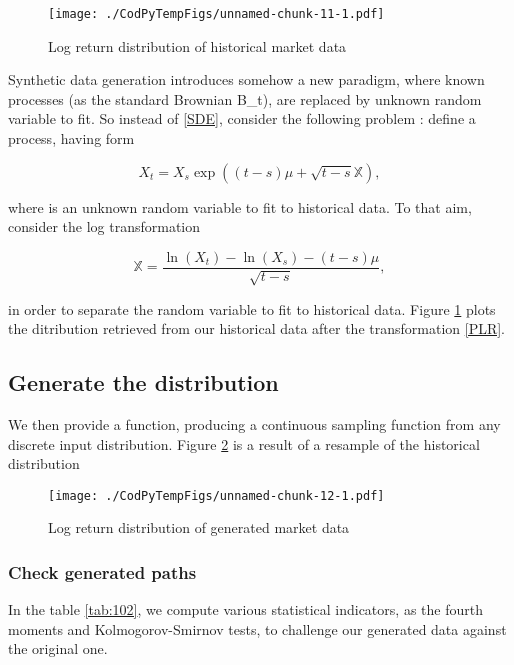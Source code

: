 \documentclass[]{article}
\def\({}%
\def\){}%
\numberwithin{equation}{section}
\begin{document}
\begin{figure}
\centering
\texttt{[image: ./CodPyTempFigs/unnamed-chunk-11-1.pdf]}
\caption{\label{plot4} Log return distribution of historical market
data}
\end{figure}

Synthetic data generation introduces somehow a new paradigm, where known
processes (as the standard Brownian \(B_t\)), are replaced by unknown
random variable to fit. So instead of \eqref{SDE}, consider the
following problem : define a process, having form

\begin{equation}\label{PLR}
  X_t = X_s \exp( (t-s) \mu + \sqrt{t-s} \mathbb{X}),
\end{equation}

where \(\) is an unknown random variable to fit to historical
data. To that aim, consider the log transformation

\begin{equation}\label{LOG}
  \mathbb{X} = \frac{\ln(X_t) - \ln(X_s) - (t-s) \mu}{\sqrt{t-s}},
\end{equation}

in order to separate the random variable \(\) to fit to
historical data. Figure \ref{plot4} plots the ditribution retrieved from
our historical data after the transformation \eqref{PLR}.

\newpage

\subsection{Generate the distribution}\label{generate-the-distribution}

We then provide a function, producing a continuous sampling function
from any discrete input distribution. Figure \ref{plot5} is a result of
a resample of the historical distribution

\begin{figure}
\centering
\texttt{[image: ./CodPyTempFigs/unnamed-chunk-12-1.pdf]}
\caption{\label{plot5} Log return distribution of generated market data}
\end{figure}

\subsubsection{Check generated paths}\label{check-generated-paths}

In the table \ref{tab:102}, we compute various statistical indicators,
as the fourth moments and Kolmogorov-Smirnov tests, to challenge our
generated data against the original one.
\end{document}
